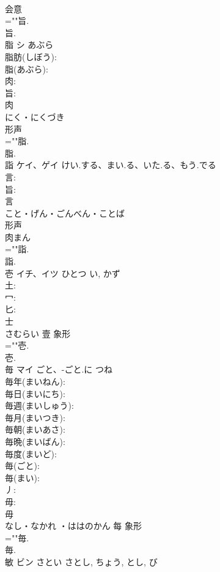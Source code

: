 \documentclass[8pt]{extreport}
\begin{document}
\begin{CJK}{UTF8}{min}
\\	会意 
\\	=""旨.
\\	旨.
\\	脂	シ	あぶら		
\\	脂肪(しぼう): 
\\	脂(あぶら): 
\\	肉: 
\\	旨: 
\\	肉	
\\	にく・にくづき	
\\	形声 
\\	=""脂.
\\	脂.
\\	詣	ケイ、ゲイ	けい.する、まい.る、いた.る、もう.でる		
\\	言: 
\\	旨: 
\\	言	
\\	こと・げん・ごんべん・ことば	
\\	形声 
\\	肉まん 
\\	=""詣.
\\	詣.
\\	壱	イチ、イツ	ひとつ	い, かず	
\\	土: 
\\	冖: 
\\	匕: 
\\	士	
\\	さむらい	壹	象形 
\\	=""壱.
\\	壱.
\\	毎	マイ	ごと、-ごと.に	つね	
\\	毎年(まいねん): 
\\	毎日(まいにち): 
\\	毎週(まいしゅう): 
\\	毎月(まいつき): 
\\	毎朝(まいあさ): 
\\	毎晩(まいばん): 
\\	毎度(まいど): 
\\	毎(ごと): 
\\	毎(まい): 
\\	丿: 
\\	毋: 
\\	毋	
\\	なし・なかれ ・ははのかん	每	象形 
\\	=""毎.
\\	毎.
\\	敏	ビン	さとい	さとし, ちょう, とし, び	

\end{CJK}
\end{document}
